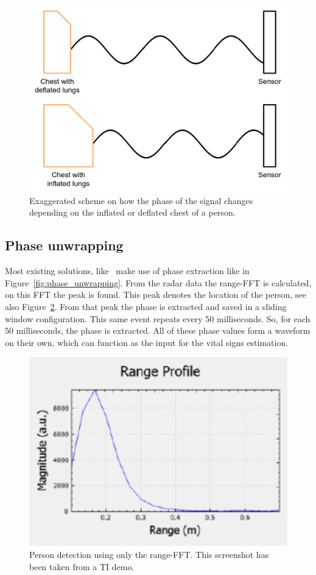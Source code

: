 \begin{figure}[t]
\centering
\includegraphics[width=.7\textwidth]{figures/measuring_vital_signs/phase_difference.png}
\caption{Exaggerated scheme on how the phase of the signal changes depending on the inflated or deflated chest of a person.}
\label{fig:phase_difference}
\end{figure}

\subsection{Phase unwrapping}
Most existing solutions, like~\cite{li2009radar, yang2016monitoring, alizadeh2019remote} make use of phase extraction like in Figure~\ref{fig:phase_unwrapping}. From the radar data the range-FFT is calculated, on this FFT the peak is found. This peak denotes the location of the person, see also Figure~\ref{fig:ti_fft}. From that peak the phase is extracted and saved in a sliding window configuration. This same event repeats every 50 milliseconds. So, for each 50 milliseconds, the phase is extracted. All of these phase values form a waveform on their own, which can function as the input for the vital signs estimation. 

\begin{figure}[t]
\centering
\includegraphics[width=.5\textwidth]{figures/measuring_vital_signs/ti_range_fft.png}
\caption{Person detection using only the range-FFT. This screenshot has been taken from a TI demo.}
\label{fig:ti_fft}
\end{figure}

